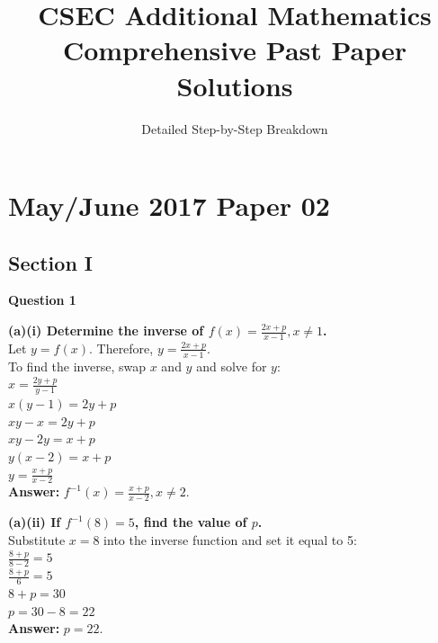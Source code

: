 \documentclass[12pt]{article}
\title{\textbf{CSEC Additional Mathematics \\ Comprehensive Past Paper Solutions}}
\author{Detailed Step-by-Step Breakdown}
\date{}
\begin{document}
\maketitle
\tableofcontents
\newpage

\section{May/June 2017 Paper 02}

\subsection*{Section I}

\textbf{Question 1}

\textbf{(a)(i) Determine the inverse of $f(x) = \frac{2x+p}{x-1}, x \neq 1$.} \\
Let $y = f(x)$. Therefore, $y = \frac{2x+p}{x-1}$. \\
To find the inverse, swap $x$ and $y$ and solve for $y$: \\
$x = \frac{2y+p}{y-1}$ \\
$x(y - 1) = 2y + p$ \\
$xy - x = 2y + p$ \\
$xy - 2y = x + p$ \\
$y(x - 2) = x + p$ \\
$y = \frac{x+p}{x-2}$ \\
\textbf{Answer:} $f^{-1}(x) = \frac{x+p}{x-2}, x \neq 2$.

\textbf{(a)(ii) If $f^{-1}(8) = 5$, find the value of $p$.} \\
Substitute $x = 8$ into the inverse function and set it equal to 5: \\
$\frac{8+p}{8-2} = 5$ \\
$\frac{8+p}{6} = 5$ \\
$8 + p = 30$ \\
$p = 30 - 8 = 22$ \\
\textbf{Answer:} $p = 22$.
\end{document}
